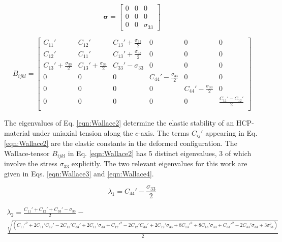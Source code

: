 \documentclass[showpacs,aps,floatfix,prb,reprint,superscriptaddress]{revtex4-1}
\begin{document}
\begin{equation}
\label{eqn:solidstress1}
\mathbf{\sigma} =  \begin{bmatrix}
       0 & 0 & 0           \\[0.3em]
       0 & 0           & 0 \\[0.3em]
       0           & 0 & \sigma_{33}
     \end{bmatrix}
\end{equation}

\begin{widetext}
\begin{equation}
\label{eqn:Wallace2}
B_{ijkl} = \begin{bmatrix}
C_{11}' & C_{12}' & C_{13}' + \frac{\sigma_{33}}{2} & 0  & 0 & 0  \\[0.20em]
C_{12}' & C_{11}' & C_{13}' + \frac{\sigma_{33}}{2} & 0  & 0 & 0   \\[0.20em]
C_{13}' + \frac{\sigma_{33}}{2} & C_{13}' + \frac{\sigma_{33}}{2}  & C_{33}'-\sigma_{33}  & 0  & 0 & 0  \\[0.20em]
0  & 0 & 0 & C_{44}'-\frac{\sigma_{33}}{2} & 0 & 0 \\[0.20em]
0  & 0 & 0 & 0 & C_{44}'-\frac{\sigma_{33}}{2} & 0  \\[0.20em]
0  & 0 & 0 & 0 & 0 & \frac{C_{11}'-C_{12}'}{2}  \\[0.20em]
\end{bmatrix}
\end{equation}
\end{widetext}

The eigenvalues of Eq. \ref{eqn:Wallace2} determine the elastic stability of an HCP-material under uniaxial tension along the $c$-axis. The terms $C_{ij}'$ appearing in Eq. \ref{eqn:Wallace2} are the elastic constants in the deformed configuration. The Wallace-tensor $B_{ijkl}$ in Eq. \ref{eqn:Wallace2} has 5 distinct eigenvalues, 3 of which involve the stress $\sigma_{33}$ explicitly. The two relevant eigenvalues for this work are given in Eqs. \ref{eqn:Wallace3} and \ref{eqn:Wallace4}.

\begin{equation}
\label{eqn:Wallace3} 
\lambda_{1} = C_{44}' - \frac{\sigma_{33}}{2} 
\end{equation}


\begin{widetext}
\begin{multline}
\label{eqn:Wallace4}
\lambda_{2} =  \frac{C_{11}' + C_{12}' + C_{33}' - \sigma_{33}}{2} - \\ \frac{\sqrt{(C_{11}'^2 + 2C_{11}'C_{12}' - 2C_{11}'C_{33}' + 2C_{11}'\sigma_{33} +  C_{12}'^2 - 2C_{12}'C_{33}' + 2C_{12}'\sigma_{33} + 8C_{13}'^2 + 8C_{13}'\sigma_{33} + C_{33}'^2 - 2C_{33}'\sigma_{33} + 3\sigma_{33}^2)}}{2}
\end{multline}
\end{widetext}
\end{document}
